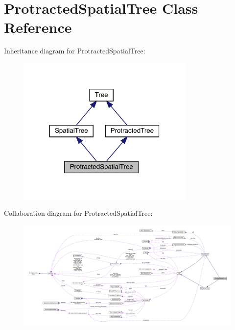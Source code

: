 \hypertarget{class_protracted_spatial_tree}{}\section{Protracted\+Spatial\+Tree Class Reference}
\label{class_protracted_spatial_tree}


Inheritance diagram for Protracted\+Spatial\+Tree\+:
\nopagebreak
\begin{figure}[H]
\begin{center}
\leavevmode
\includegraphics[width=248pt]{class_protracted_spatial_tree__inherit__graph}
\end{center}
\end{figure}


Collaboration diagram for Protracted\+Spatial\+Tree\+:
\nopagebreak
\begin{figure}[H]
\begin{center}
\leavevmode
\includegraphics[width=350pt]{class_protracted_spatial_tree__coll__graph}
\end{center}
\end{figure}
